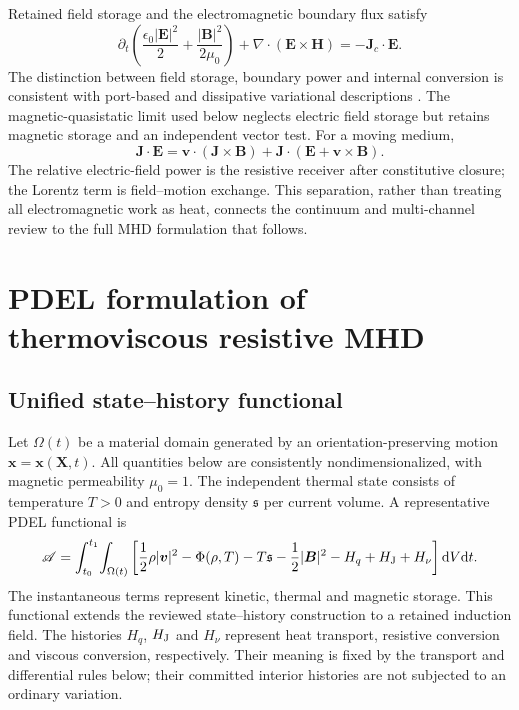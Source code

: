 \documentclass[11pt,a4paper]{article}
\theoremstyle{remark}\newtheorem{remark}{Remark}
\numberwithin{equation}{section}
\newcommand{\dd}{\mathrm{d}}
\newcommand{\vv}{\boldsymbol v}
\newcommand{\BB}{\boldsymbol B}
\newcommand{\JJ}{\boldsymbol J}
\newcommand{\EE}{\boldsymbol E}
\newcommand{\xx}{\boldsymbol x}
\newcommand{\XX}{\boldsymbol X}
\newcommand{\diver}{\nabla\!\cdot}
\newcommand{\st}{\mathfrak s}
\begin{document}
Retained field storage and the electromagnetic boundary flux satisfy
\begin{equation}
\partial_t\left(\frac{\epsilon_0|\EE|^2}{2}
+\frac{|\BB|^2}{2\mu_0}\right)
+\diver(\EE\times\boldsymbol H)=-\JJ_c\cdot\EE.
\label{eq:reviewpoynting}
\end{equation}
The distinction between field storage, boundary power and internal conversion is consistent with port-based and dissipative variational descriptions \citep{PortHamiltonian,Carlier,Gawlik2025}. The magnetic-quasistatic limit used below neglects electric field storage but retains magnetic storage and an independent vector test. For a moving medium,
\begin{equation}
\JJ\cdot\EE=\vv\cdot(\JJ\times\BB)
+\JJ\cdot(\EE+\vv\times\BB).
\label{eq:reviewEMsplit}
\end{equation}
The relative electric-field power is the resistive receiver after constitutive closure; the Lorentz term is field--motion exchange. This separation, rather than treating all electromagnetic work as heat, connects the continuum and multi-channel review to the full MHD formulation that follows.


\section{PDEL formulation of thermoviscous resistive MHD}\label{sec:pdel}
\subsection{Unified state--history functional}
Let $\Omega(t)$ be a material domain generated by an orientation-preserving motion $\xx=\xx(\XX,t)$. All quantities below are consistently nondimensionalized, with magnetic permeability $\mu_0=1$. The independent thermal state consists of temperature $T>0$ and entropy density $\st$ per current volume. A representative PDEL functional is
\begin{equation}
\mathscr A=\int_{t_0}^{t_1}\!\int_{\Omega(t)}
\left[\frac12\rho|\vv|^2-\Phi(\rho,T)-T\st
-\frac12|\BB|^2-H_q+H_{\rm J}+H_\nu\right]\dd V\dd t.
\label{eq:action}
\end{equation}
The instantaneous terms represent kinetic, thermal and magnetic storage. This functional extends the reviewed state--history construction \citep{RenEntropy,RenSpending,RenEulerian,RenMultiChannel} to a retained induction field. The histories $H_q$, $H_{\rm J}$ and $H_\nu$ represent heat transport, resistive conversion and viscous conversion, respectively. Their meaning is fixed by the transport and differential rules below; their committed interior histories are not subjected to an ordinary variation.
\end{document}
